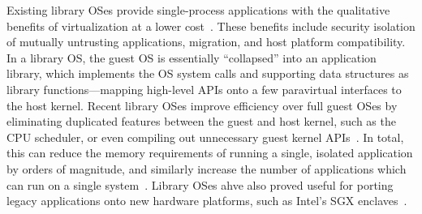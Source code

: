 
Existing library OSes provide single-process applications
with the qualitative benefits of virtualization
at a lower cost~\citep{porter11drawbridge,unikernels,baumann13bascule}.
These benefits include security isolation of mutually untrusting applications,
migration, and host platform compatibility.
In a library OS, the guest OS is essentially ``collapsed''
into an application library,
which implements the OS system calls and supporting data structures as library functions---mapping
high-level APIs onto
a few paravirtual interfaces to the host kernel.
Recent library OSes improve efficiency over full guest OSes by eliminating duplicated features
between the guest and host kernel,
such as the CPU scheduler, or
even compiling out unnecessary guest kernel APIs~\citep{unikernels}.
In total, this can reduce the memory requirements of running a single, isolated application
by orders of magnitude, and similarly
increase the number of applications which can run
on a single system~\citep{porter11drawbridge,unikernels}.
Library OSes ahve also proved
useful for porting legacy applications
onto new hardware platforms, such as Intel's SGX enclaves~\citep{baumann14haven}.



